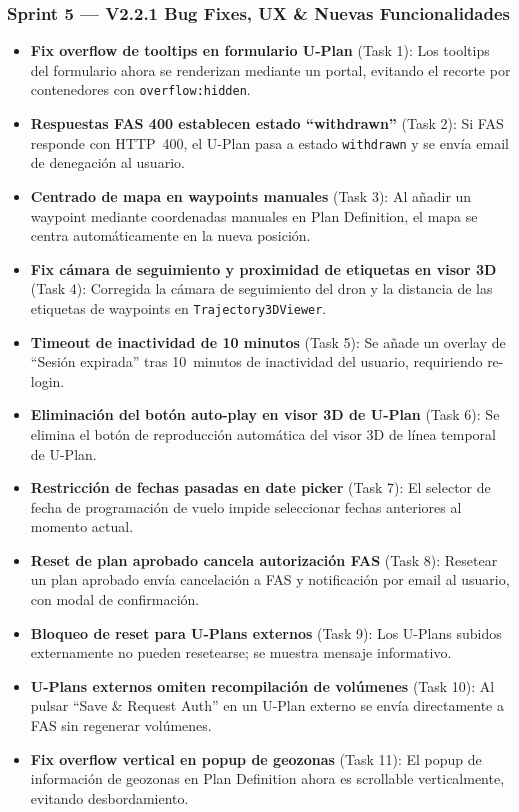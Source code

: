 \documentclass[12pt,a4paper]{article}
\begin{document}
\subsubsection*{Sprint 5 --- V2.2.1 Bug Fixes, UX \& Nuevas Funcionalidades}
\begin{itemize}
    \item \textbf{Fix overflow de tooltips en formulario U-Plan} (Task 1): Los tooltips del formulario ahora se renderizan mediante un portal, evitando el recorte por contenedores con \texttt{overflow:hidden}.
    \item \textbf{Respuestas FAS 400 establecen estado ``withdrawn''} (Task 2): Si FAS responde con HTTP~400, el U-Plan pasa a estado \texttt{withdrawn} y se envía email de denegación al usuario.
    \item \textbf{Centrado de mapa en waypoints manuales} (Task 3): Al añadir un waypoint mediante coordenadas manuales en Plan Definition, el mapa se centra automáticamente en la nueva posición.
    \item \textbf{Fix cámara de seguimiento y proximidad de etiquetas en visor 3D} (Task 4): Corregida la cámara de seguimiento del dron y la distancia de las etiquetas de waypoints en \texttt{Trajectory3DViewer}.
    \item \textbf{Timeout de inactividad de 10 minutos} (Task 5): Se añade un overlay de ``Sesión expirada'' tras 10~minutos de inactividad del usuario, requiriendo re-login.
    \item \textbf{Eliminación del botón auto-play en visor 3D de U-Plan} (Task 6): Se elimina el botón de reproducción automática del visor 3D de línea temporal de U-Plan.
    \item \textbf{Restricción de fechas pasadas en date picker} (Task 7): El selector de fecha de programación de vuelo impide seleccionar fechas anteriores al momento actual.
    \item \textbf{Reset de plan aprobado cancela autorización FAS} (Task 8): Resetear un plan aprobado envía cancelación a FAS y notificación por email al usuario, con modal de confirmación.
    \item \textbf{Bloqueo de reset para U-Plans externos} (Task 9): Los U-Plans subidos externamente no pueden resetearse; se muestra mensaje informativo.
    \item \textbf{U-Plans externos omiten recompilación de volúmenes} (Task 10): Al pulsar ``Save \& Request Auth'' en un U-Plan externo se envía directamente a FAS sin regenerar volúmenes.
    \item \textbf{Fix overflow vertical en popup de geozonas} (Task 11): El popup de información de geozonas en Plan Definition ahora es scrollable verticalmente, evitando desbordamiento.

\end{itemize}
\end{document}
